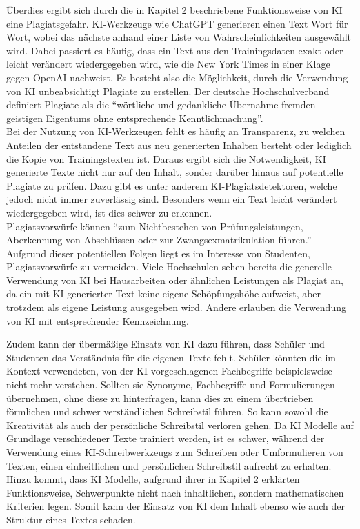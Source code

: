 \documentclass[../main.tex]{subfiles}
\begin{document}
Überdies ergibt sich durch die in Kapitel 2 beschriebene Funktionsweise von KI eine Plagiatsgefahr. KI-Werkzeuge wie ChatGPT generieren einen Text Wort für Wort, wobei das nächste anhand 
einer Liste von Wahrscheinlichkeiten ausgewählt wird. Dabei passiert es häufig, dass ein Text aus den Trainingsdaten exakt oder leicht verändert wiedergegeben wird, wie die New York Times in 
einer Klage gegen OpenAI nachweist\cite{NYTimes}. Es besteht also die Möglichkeit, durch die Verwendung von KI unbeabsichtigt Plagiate zu erstellen. Der deutsche Hochschulverband definiert Plagiate als 
die “wörtliche und gedankliche Übernahme fremden geistigen Eigentums ohne entsprechende Kenntlichmachung”.\cite{Hochschulverband} \\ Bei der Nutzung von KI-Werkzeugen fehlt es häufig an Transparenz, 
zu welchen Anteilen der entstandene Text aus neu generierten Inhalten besteht oder lediglich die Kopie von Trainingstexten ist. Daraus ergibt sich die Notwendigkeit, KI generierte Texte nicht nur 
auf den Inhalt, sonder darüber hinaus auf potentielle Plagiate zu prüfen. Dazu gibt es unter anderem KI-Plagiatsdetektoren, welche jedoch nicht immer zuverlässig sind. Besonders wenn ein Text 
leicht verändert wiedergegeben wird, ist dies schwer zu erkennen.\\ Plagiatsvorwürfe können “zum Nichtbestehen von Prüfungsleistungen, Aberkennung von Abschlüssen  oder  zur  Zwangsexmatrikulation  
führen.”\cite{Plagiate} Aufgrund dieser potentiellen Folgen liegt es im Interesse von Studenten, Plagiatsvorwürfe zu vermeiden. Viele Hochschulen sehen bereits die generelle Verwendung von KI bei Hausarbeiten 
oder ähnlichen Leistungen als Plagiat an, da ein mit KI generierter Text keine eigene Schöpfungshöhe aufweist, aber trotzdem als eigene Leistung ausgegeben wird. Andere erlauben die Verwendung von 
KI mit entsprechender Kennzeichnung.\cite{Plagiate}

Zudem kann der übermäßige Einsatz von KI dazu führen, dass Schüler und Studenten das Verständnis für die eigenen Texte fehlt. Schüler könnten die im 
Kontext verwendeten, von der KI vorgeschlagenen Fachbegriffe beispielsweise nicht mehr verstehen. Sollten sie Synonyme, Fachbegriffe und Formulierungen 
übernehmen, ohne diese zu hinterfragen, kann dies zu einem übertrieben förmlichen und schwer verständlichen Schreibstil führen\cite{teachers}. 
So kann sowohl die Kreativität als auch der persönliche Schreibstil verloren gehen. Da KI Modelle auf Grundlage verschiedener Texte trainiert werden, ist es
schwer, während der Verwendung eines KI-Schreibwerkzeugs zum Schreiben oder Umformulieren von Texten, einen einheitlichen und persönlichen Schreibstil aufrecht zu erhalten\cite{creativeWriting}. Hinzu kommt,
dass KI Modelle, aufgrund ihrer in Kapitel 2 erklärten Funktionsweise, Schwerpunkte nicht nach inhaltlichen, sondern mathematischen Kriterien legen\cite{berensBolk}. Somit kann der 
Einsatz von KI dem Inhalt ebenso wie auch der Struktur eines Textes schaden.\\
\end{document}
